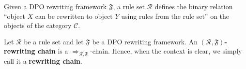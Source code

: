 Given a DPO rewriting framework \(\mathfrak{F}\), a rule set \(\mathcal{R}\) defines the binary relation \enquote{object $X$ can be rewritten to object $Y$ using rules from the rule set} on the objects of the category $\mathcal{C}$.
\begin{definition}\label{def:rewriting-chain}
Let \(\mathcal{R}\) be a rule set and let \(\mathfrak{F}\) be a DPO rewriting framework.
An \textbf{\((\mathcal{R},\mathfrak{F})\)-rewriting chain} is a \(\Rightarrow_{\mathcal{R},\mathfrak{F}}\)-chain. Hence, when the context is clear, we simply call it a \textbf{rewriting chain}.
\end{definition}

